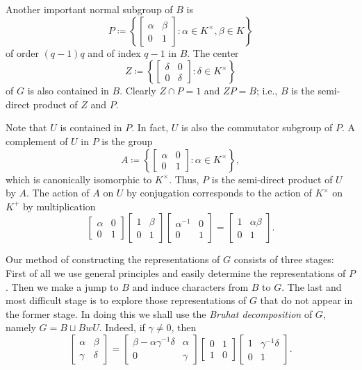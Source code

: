\documentclass[../main.tex]{subfiles}
\begin{document}
Another important normal subgroup of $B$ is
\[P\coloneqq\left\{\begin{bmatrix}
	\alpha & \beta \\
	0 & 1
\end{bmatrix}:\alpha\in K^\times,\beta\in K\right\}\]
of order $(q-1)q$ and of index $q-1$ in $B$. The center
\[Z\coloneqq\left\{\begin{bmatrix}
	\delta & 0 \\
	0 & \delta
\end{bmatrix}:\delta\in K^\times\right\}\]
of $G$ is also contained in $B$. Clearly $Z\cap P=1$ and $ZP=B$; i.e., $B$ is the semi-direct product of $Z$ and $P$.

Note that $U$ is contained in $P$. In fact, $U$ is also the commutator subgroup of $P$. A complement of $U$ in $P$ is the group
\[A\coloneqq\left\{\begin{bmatrix}
	\alpha & 0 \\
	0 & 1
\end{bmatrix}:\alpha\in K^\times\right\},\]
which is canonically isomorphic to $K^\times$. Thus, $P$ is the semi-direct product of $U$ by $A$. The action of $A$ on $U$ by conjugation corresponds to the action of $K^\times$ on $K^+$ by multiplication
\[\begin{bmatrix}
	\alpha & 0 \\
	0 & 1
\end{bmatrix}\begin{bmatrix}
	1 & \beta \\
	0 & 1
\end{bmatrix}\begin{bmatrix}
	\alpha^{-1} & 0 \\
	0 & 1
\end{bmatrix}=\begin{bmatrix}
	1 & \alpha\beta \\
	0 & 1
\end{bmatrix}.\]

Our method of constructing the representations of $G$ consists of three stages: First of all we use general principles and easily determine the representations of $P$. Then we make a jump to $B$ and induce characters from $B$ to $G$. The last and most difficult stage is to explore those representations of $G$ that do not appear in the former stage. In doing this we shall use the \textit{Bruhat decomposition} of $G$, namely $G=B\sqcup BwU$. Indeed, if $\gamma\ne0$, then
\[\begin{bmatrix}
	\alpha & \beta \\
	\gamma & \delta
\end{bmatrix}=\begin{bmatrix}
	\beta-\alpha\gamma^{-1}\delta & \alpha \\
	0 & \gamma
\end{bmatrix}\begin{bmatrix}
	0 & 1 \\
	1 & 0
\end{bmatrix}\begin{bmatrix}
	1 & \gamma^{-1}\delta \\
	0 & 1
\end{bmatrix}.\]
\end{document}
